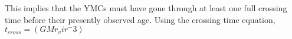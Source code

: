 This implies that the YMCs must have gone through at least one full crossing time before their presently observed age. Using the crossing time equation, $t_{cross}=(GMr_vir^-3)$